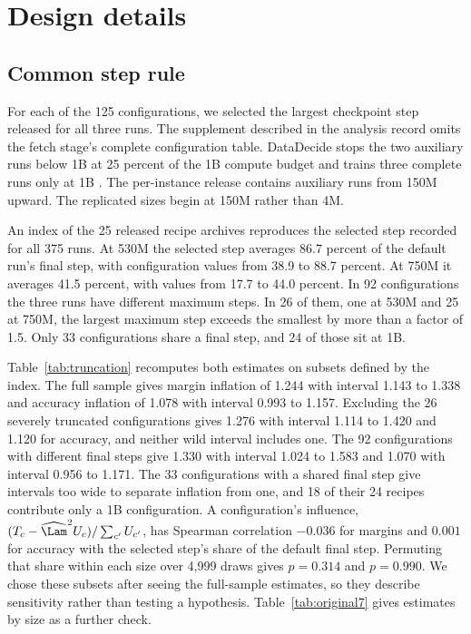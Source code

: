 \section{Design details}
\label{app:design}

\subsection{Common step rule}
\label{app:schedule}
For each of the 125 configurations, we selected the largest checkpoint step released for all three runs. The supplement described in the analysis record omits the fetch stage's complete configuration table. DataDecide stops the two auxiliary runs below 1B at 25 percent of the 1B compute budget and trains three complete runs only at 1B \citep{magnusson2025}. The per-instance release contains auxiliary runs from 150M upward. The replicated sizes begin at 150M rather than 4M.

An index of the 25 released recipe archives reproduces the selected step recorded for all 375 runs. At 530M the selected step averages 86.7 percent of the default run's final step, with configuration values from 38.9 to 88.7 percent. At 750M it averages 41.5 percent, with values from 17.7 to 44.0 percent. In 92 configurations the three runs have different maximum steps. In 26 of them, one at 530M and 25 at 750M, the largest maximum step exceeds the smallest by more than a factor of 1.5. Only 33 configurations share a final step, and 24 of those sit at 1B.

Table~\ref{tab:truncation} recomputes both estimates on subsets defined by the index. The full sample gives margin inflation of 1.244 with interval 1.143 to 1.338 and accuracy inflation of 1.078 with interval 0.993 to 1.157. Excluding the 26 severely truncated configurations gives 1.276 with interval 1.114 to 1.420 and 1.120 for accuracy, and neither wild interval includes one. The 92 configurations with different final steps give 1.330 with interval 1.024 to 1.583 and 1.070 with interval 0.956 to 1.171. The 33 configurations with a shared final step give intervals too wide to separate inflation from one, and 18 of their 24 recipes contribute only a 1B configuration. A configuration's influence, $(T_c-\widehat\Lam^2U_c)/\sum_{c'}U_{c'}$, has Spearman correlation $-0.036$ for margins and $0.001$ for accuracy with the selected step's share of the default final step. Permuting that share within each size over 4,999 draws gives $p=0.314$ and $p=0.990$. We chose these subsets after seeing the full-sample estimates, so they describe sensitivity rather than testing a hypothesis. Table~\ref{tab:original7} gives estimates by size as a further check.

